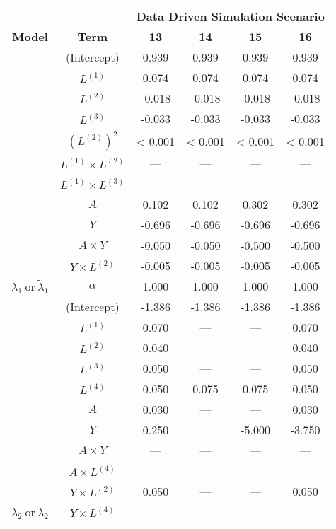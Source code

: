 \begin{sidewaystable}
\begin{minipage}[t]{0.5\textwidth}
\begin{tabular}[t]{>{}ccccc>{}c}
\hline
\multicolumn{1}{c}{\textbf{ }} & \multicolumn{1}{c}{\textbf{ }} & \multicolumn{4}{c}{\textbf{Data Driven Simulation Scenario}} \\
\cmidrule{3-6}
\textbf{Model} & \textbf{Term} & \textbf{13} & \textbf{14} & \textbf{15} & \textbf{16}\\
\hline
 & (Intercept) & 0.939 & 0.939 & 0.939 & 0.939\\
\cmidrule{2-6}
 & $L^{(1)}$ & 0.074 & 0.074 & 0.074 & 0.074\\
\cmidrule{2-6}
 & $L^{(2)}$ & -0.018 & -0.018 & -0.018 & -0.018\\
\cmidrule{2-6}
 & $L^{(3)}$ & -0.033 & -0.033 & -0.033 & -0.033\\
\cmidrule{2-6}
 & $(L^{(2)})^2$ & < 0.001 & < 0.001 & < 0.001 & < 0.001\\
\cmidrule{2-6}
 & $L^{(1)} \times L^{(2)}$ & --- & --- & --- & ---\\
\cmidrule{2-6}
 & $L^{(1)} \times L^{(3)}$ & --- & --- & --- & ---\\
\cmidrule{2-6}
 & $A$ & 0.102 & 0.102 & 0.302 & 0.302\\
\cmidrule{2-6}
 & $Y$ & -0.696 & -0.696 & -0.696 & -0.696\\
\cmidrule{2-6}
 & $A\times Y$ & -0.050 & -0.050 & -0.500 & -0.500\\
\cmidrule{2-6}
 & $Y \times L^{(2)}$ & -0.005 & -0.005 & -0.005 & -0.005\\
\cmidrule{2-6}
\multirow{-12}{*}{\centering\arraybackslash $\lambda_1~\text{or}~\tilde\lambda_1$} & $\alpha$ & 1.000 & 1.000 & 1.000 & 1.000\\
\cmidrule{1-6}
 & (Intercept) & -1.386 & -1.386 & -1.386 & -1.386\\
\cmidrule{2-6}
 & $L^{(1)}$ & 0.070 & --- & --- & 0.070\\
\cmidrule{2-6}
 & $L^{(2)}$ & 0.040 & --- & --- & 0.040\\
\cmidrule{2-6}
 & $L^{(3)}$ & 0.050 & --- & --- & 0.050\\
\cmidrule{2-6}
 & $L^{(4)}$ & 0.050 & 0.075 & 0.075 & 0.050\\
\cmidrule{2-6}
 & $A$ & 0.030 & --- & --- & 0.030\\
\cmidrule{2-6}
 & $Y$ & 0.250 & --- & -5.000 & -3.750\\
\cmidrule{2-6}
 & $A\times Y$ & --- & --- & --- & ---\\
\cmidrule{2-6}
 & $A \times L^{(4)}$ & --- & --- & --- & ---\\
\cmidrule{2-6}
 & $Y \times L^{(2)}$ & 0.050 & --- & --- & 0.050\\
\cmidrule{2-6}
\multirow{-11}{*}{\centering\arraybackslash $\lambda_2~\text{or}~\tilde\lambda_2$} & $Y \times L^{(4)}$ & --- & --- & --- & ---\\
\hline
\end{tabular}
\end{minipage}
\end{sidewaystable}



